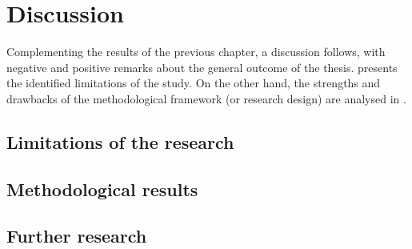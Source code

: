 \chapter{Discussion}
\label{c:discussion}

Complementing the results of the previous chapter, a discussion follows, with negative and positive remarks about the general outcome of the thesis.  presents the identified limitations of the study. On the other hand, the strengths and drawbacks of the methodological framework (or research design) are analysed in .

\section{Limitations of the research}
\label{s:discussion:limitations}


\section{Methodological results}
\label{s:discussion:methodological-results}


\section{Further research}
\label{s:discussion:further}


%